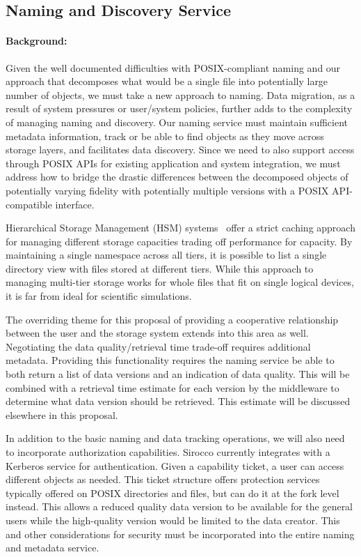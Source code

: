 \subsection{Naming and Discovery Service}
\label{sec:naming-discovery}
\paragraph{Background:}
Given the well documented difficulties with POSIX-compliant naming and our
approach that decomposes what would be a single file into potentially large
number of objects, we must take a new approach to naming.  Data migration, as a
result of system pressures or user/system policies, further adds to the
complexity of managing naming and discovery. Our naming service must maintain
sufficient metadata information, track or be able to find objects as they move
across storage layers, and facilitates data discovery. Since we need to also
support access through POSIX APIs for existing application and system
integration, we must address how to bridge the drastic differences between the
decomposed objects of potentially varying fidelity with potentially multiple
versions with a POSIX API-compatible interface.

Hierarchical Storage Management (HSM) systems~\cite{blaze:1992:hsm} offer a
strict caching approach for managing different storage capacities trading off
performance for capacity.  By maintaining a single namespace across all tiers,
it is possible to list a single directory view with files stored at different
tiers. While this approach to managing multi-tier storage works for whole files
that fit on single logical devices, it is far from ideal for scientific
simulations.

The overriding theme for this proposal of providing a cooperative relationship
between the user and the storage system extends into this area as well.
Negotiating the data quality/retrieval time trade-off requires additional
metadata.  Providing this functionality requires the naming service be able to
both return a list of data versions and an indication of data quality. This
will be combined with a retrieval time estimate for each version by the
middleware to determine what data version should be retrieved.  This estimate
will be discussed elsewhere in this proposal.

In addition to the basic naming and data tracking operations, we will also need
to incorporate authorization capabilities. Sirocco currently integrates with a
Kerberos service for authentication. Given a capability ticket, a user can
access different objects as needed. This ticket structure offers protection
services typically offered on POSIX directories and files, but can do it at the
fork level instead. This allows a reduced quality data version to be available
for the general users while the high-quality version would be limited to the
data creator. This and other considerations for security must be incorporated
into the entire naming and metadata service.

